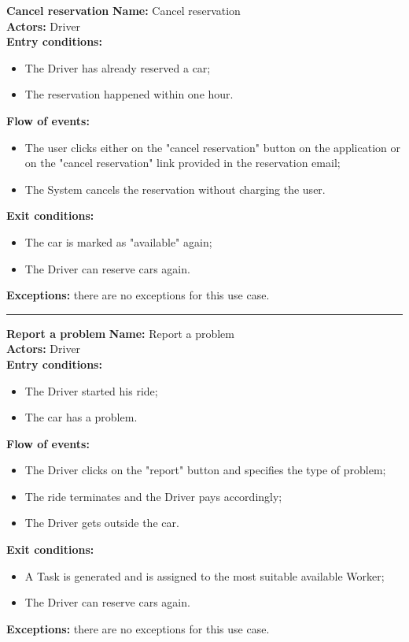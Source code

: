 \textbf{\large Cancel reservation}
\bigbreak
\textbf{Name:} Cancel reservation\\
\textbf{Actors:} Driver \\
\textbf{Entry conditions:} 
\begin{itemize}
\item The Driver has already reserved a car;
\item The reservation happened within one hour.
\end{itemize}
\textbf{Flow of events:} 
\begin{itemize}
\item The user clicks either on the "cancel reservation" button on the application or on the "cancel reservation" link provided in the reservation email;
\item The System cancels the reservation without charging the user.
\end{itemize}
\textbf{Exit conditions:} 
\begin{itemize}
\item The car is marked as "available" again;
\item The Driver can reserve cars again.
\end{itemize}
\textbf{Exceptions:} there are no exceptions for this use case.\\


\begin{center}
\noindent\rule{8cm}{1.0pt}
\end{center}


\textbf{\large Report a problem}
\bigbreak
\textbf{Name:} Report a problem\\
\textbf{Actors:} Driver \\
\textbf{Entry conditions:} 
\begin{itemize}
\item The Driver started his ride;
\item The car has a problem.
\end{itemize}
\textbf{Flow of events:} 
\begin{itemize}
\item The Driver clicks on the "report" button and specifies the type of problem; 
\item The ride terminates and the Driver pays accordingly;
\item The Driver gets outside the car.
\end{itemize}
\textbf{Exit conditions:} 
\begin{itemize}
\item A Task is generated and is assigned to the most suitable available Worker;
\item The Driver can reserve cars again.
\end{itemize}
\textbf{Exceptions:} there are no exceptions for this use case.\\


